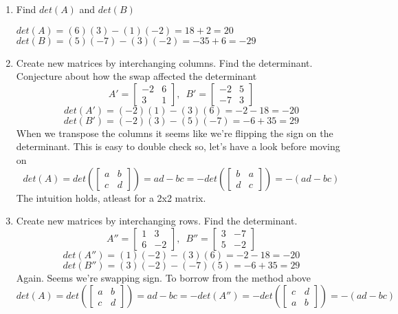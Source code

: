\documentclass{article}
\begin{document}
            \begin{enumerate}[label=(\alph*)]
                \item Find $det(A)$ and $det(B)$
                    \begin{center}
                        $det(A)=(6)(3)-(1)(-2)=18+2=20$ \\
                        $det(B)=(5)(-7)-(3)(-2)=-35+6=-29$
                    \end{center}
                \item Create new matrices by interchanging columns. Find the determinant.
                      Conjecture about how the swap affected the determinant
                        \[A'=\begin{bmatrix}-2&6\\3&1\end{bmatrix},\enspace B'=\begin{bmatrix}-2&5\\-7&3\end{bmatrix}\]
                        \[det(A')=(-2)(1)-(3)(6)=-2-18=-20\]
                        \[det(B')=(-2)(3)-(5)(-7)=-6+35=29\]
                      When we transpose the columns it seems like we're flipping the sign on the determinant.
                      This is easy to double check so, let's have a look before moving on
                        \[det(A)=det\left(\begin{bmatrix}a&b\\c&d\end{bmatrix}\right)=ad-bc=-det(\begin{bmatrix}b&a\\d&c\end{bmatrix})=-(ad-bc)\]
                      The intuition holds, atleast for a 2x2 matrix.
                \item Create new matrices by interchanging rows. Find the determinant. 
                        \[A''=\begin{bmatrix}1&3\\6&-2\end{bmatrix},\enspace B''=\begin{bmatrix}3&-7\\5&-2\end{bmatrix}\]
                        \[det(A'')=(1)(-2)-(3)(6)=-2-18=-20\]
                        \[det(B'')=(3)(-2)-(-7)(5)=-6+35=29\]
                      Again. Seems we're swapping sign. To borrow from the method above
                        \[det(A)=det(\begin{bmatrix}a&b\\c&d\end{bmatrix})=ad-bc=-det(A'')=-det(\begin{bmatrix}c&d\\a&b\end{bmatrix})=-(ad-bc)\]

\end{enumerate}
\end{document}
